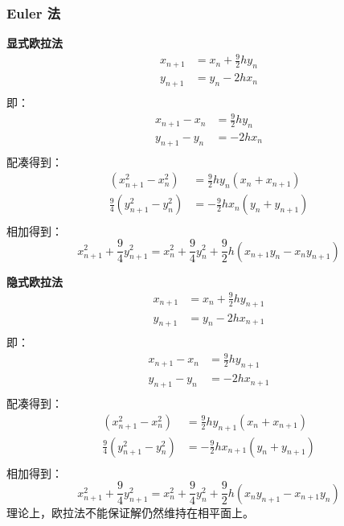 \documentclass{article}
\begin{document}
\subsubsection{Euler 法}
\textbf{显式欧拉法}
\begin{equation*}
    \begin{aligned}
        x_{n+1}&=x_{n}+\frac{9}{2}hy_{n}\\
        y_{n+1}&=y_{n}-2hx_{n}\\
    \end{aligned}
\end{equation*}
即：
\begin{equation*}
    \begin{aligned}
        x_{n+1}-x_{n}&=\frac{9}{2}hy_{n}\\
        y_{n+1}-y_{n}&=-2hx_{n}\\
    \end{aligned}
\end{equation*}
配凑得到：
\begin{equation*}
    \begin{aligned}
        (x_{n+1}^2-x_{n}^2)&=\frac{9}{2}hy_{n}(x_{n}+x_{n+1})\\
        \frac{9}{4}(y_{n+1}^2-y_{n}^2)&=-\frac{9}{2}hx_{n}(y_{n}+y_{n+1})\\
    \end{aligned}
\end{equation*}
相加得到：
\begin{equation*}
    x_{n+1}^2+\frac{9}{4}y_{n+1}^2=x_{n}^2+\frac{9}{4}y_{n}^2+\frac{9}{2}h(x_{n+1}y_{n}-x_{n}y_{n+1})
\end{equation*}

\textbf{隐式欧拉法}
\begin{equation*}
    \begin{aligned}
        x_{n+1}&=x_{n}+\frac{9}{2}hy_{n+1}\\
        y_{n+1}&=y_{n}-2hx_{n+1}\\
    \end{aligned}
\end{equation*}
即：
\begin{equation*}
    \begin{aligned}
        x_{n+1}-x_{n}&=\frac{9}{2}hy_{n+1}\\
        y_{n+1}-y_{n}&=-2hx_{n+1}\\
    \end{aligned}
\end{equation*}
配凑得到：
\begin{equation*}
    \begin{aligned}
        (x_{n+1}^2-x_{n}^2)&=\frac{9}{2}hy_{n+1}(x_{n}+x_{n+1})\\
        \frac{9}{4}(y_{n+1}^2-y_{n}^2)&=-\frac{9}{2}hx_{n+1}(y_{n}+y_{n+1})\\
    \end{aligned}
\end{equation*}
相加得到：
\begin{equation*}
    x_{n+1}^2+\frac{9}{4}y_{n+1}^2=x_{n}^2+\frac{9}{4}y_{n}^2+\frac{9}{2}h(x_{n}y_{n+1}-x_{n+1}y_{n})
\end{equation*}
理论上，欧拉法不能保证解仍然维持在相平面上。
\end{document}
